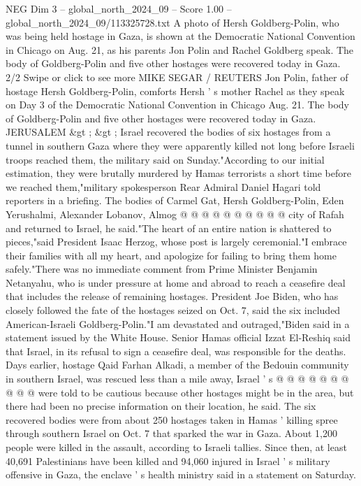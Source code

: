 \begin{textsample}{NEG Dim 3 – global\_north\_2024\_09 – Score 1.00 – global\_north\_2024\_09/113325728.txt}  \label{ex:f3_neg_300}
A photo of Hersh Goldberg-Polin, who was being held hostage in Gaza, is shown at the Democratic National Convention in Chicago on Aug. 21, as his parents Jon Polin and Rachel Goldberg speak.
The body of Goldberg-Polin and five other hostages were recovered today in Gaza. 2/2 Swipe or click to see more MIKE SEGAR / REUTERS Jon Polin, father of hostage Hersh Goldberg-Polin, comforts Hersh ' s mother Rachel as they speak on Day 3 of the Democratic National Convention in Chicago Aug. 21.
The body of Goldberg-Polin and five other hostages were recovered today in Gaza.
JERUSALEM \&gt ; \&gt ; Israel recovered the bodies of six hostages from a tunnel in southern Gaza where they were apparently killed not long before Israeli troops reached them, the military said on Sunday."According to our initial estimation, they were brutally murdered by Hamas terrorists a short time before we reached them,"military spokesperson Rear Admiral Daniel Hagari told reporters in a briefing.
The bodies of Carmel Gat, Hersh Goldberg-Polin, Eden Yerushalmi, Alexander Lobanov, Almog @ @ @ @ @ @ @ @ @ @ city of Rafah and returned to Israel, he said."The heart of an entire nation is shattered to pieces,"said President Isaac Herzog, whose post is largely ceremonial."I embrace their families with all my heart, and apologize for failing to bring them home safely."There was no immediate comment from Prime Minister Benjamin Netanyahu, who is under pressure at home and abroad to reach a ceasefire deal that includes the release of remaining hostages.
President Joe Biden, who has closely followed the fate of the hostages seized on Oct. 7, said the six included American-Israeli Goldberg-Polin."I am devastated and outraged,"Biden said in a statement issued by the White House.
Senior Hamas official Izzat El-Reshiq said that Israel, in its refusal to sign a ceasefire deal, was responsible for the deaths.
Days earlier, hostage Qaid Farhan Alkadi, a member of the Bedouin community in southern Israel, was rescued less than a mile away, Israel ' s @ @ @ @ @ @ @ @ @ @ were told to be cautious because other hostages might be in the area, but there had been no precise information on their location, he said.
The six recovered bodies were from about 250 hostages taken in Hamas ' killing spree through southern Israel on Oct. 7 that sparked the war in Gaza.
About 1,200 people were killed in the assault, according to Israeli tallies.
Since then, at least 40,691 Palestinians have been killed and 94,060 injured in Israel ' s military offensive in Gaza, the enclave ' s health ministry said in a statement on Saturday.

\end{textsample}

